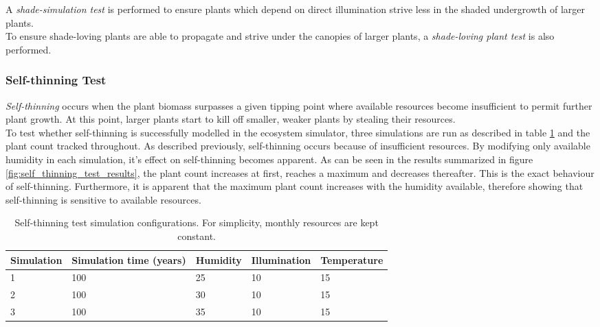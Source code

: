 A \textit{shade-simulation test} is performed to ensure plants which depend on direct illumination strive less in the shaded undergrowth of larger plants.\\ 

To ensure shade-loving plants are able to propagate and strive under the canopies of larger plants, a \textit{shade-loving plant test} is also performed.

\subsubsection{Self-thinning Test}

\textit{Self-thinning} occurs when the plant biomass surpasses a given tipping point where available resources become insufficient to permit further plant growth. At this point, larger plants start to kill off smaller, weaker plants by stealing their resources.\\

To test whether self-thinning is successfully modelled in the ecosystem simulator, three simulations are run as described in table \ref{tab:self_thinning_test_simulations} and the plant count tracked throughout. As described previously, self-thinning occurs because of insufficient resources. By modifying only available humidity in each simulation, it's effect on self-thinning becomes apparent. As can be seen in the results summarized in figure \ref{fig:self_thinning_test_results}, the plant count increases at first, reaches a maximum and decreases thereafter. This is the exact behaviour of self-thinning. Furthermore, it is apparent that the maximum plant count increases with the humidity available, therefore showing that self-thinning is sensitive to available resources.

\begin{table}[]
  \centering
	    \begin{tabular}{|p{3cm}|p{3cm}|p{3cm}|p{3cm}|p{3cm}|}
		\hline
		\textbf{Simulation} & \textbf{Simulation time (years)} & \textbf{Humidity} & \textbf{Illumination} & \textbf{Temperature}\\
		\hline       
		1 & 100 & 25 & 10 & 15\\           
		\hline       
		2 & 100 & 30 & 10 & 15\\   
		\hline       
		3 & 100 & 35 & 10 & 15\\              
		\hline       
		\end{tabular}
		\caption{Self-thinning test simulation configurations. For simplicity, monthly resources are kept constant.}
		\label{tab:self_thinning_test_simulations}
\end{table}

